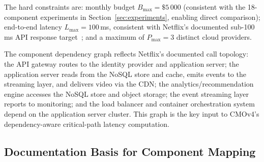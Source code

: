 \documentclass[journal]{IEEEtran}
\newcommand{\cmofour}{CMOv4\xspace}
\begin{document}
The hard constraints are: monthly budget $B_{\max} = \$5\,000$ (consistent with
the 18-component experiments in Section~\ref{sec:experiments}, enabling direct
comparison); end-to-end latency $L_{\max} = 100$\,ms, consistent with Netflix's
documented sub-100\,ms API response target~\cite{netflix_techblog}; and a
maximum of $P_{\max} = 3$ distinct cloud providers.

The component dependency graph reflects Netflix's documented call topology:
the API gateway routes to the identity provider and application server; the
application server reads from the NoSQL store and cache, emits events to the
streaming layer, and delivers video via the CDN; the analytics/recommendation
engine accesses the NoSQL store and object storage; the event streaming layer
reports to monitoring; and the load balancer and container orchestration system
depend on the application server cluster. This graph is the key input to
\cmofour's dependency-aware critical-path latency computation.

\subsection{Documentation Basis for Component Mapping}
\label{sec:netflix_docs}
\end{document}
